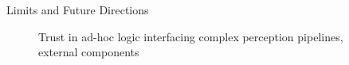 \begin{frame}{Limits and Future Directions}
\begin{figure}[ht]
\begin{minipage}[t]{0.46\linewidth}
            \centering
            Trust in ad-hoc logic interfacing complex perception pipelines, external components
        \end{minipage}
     	\end{figure}
\end{frame}


